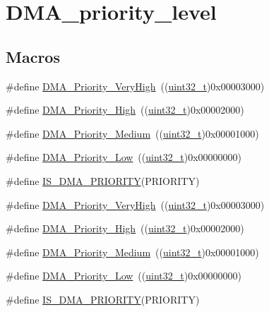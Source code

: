 \hypertarget{group___d_m_a__priority__level}{}\section{D\+M\+A\+\_\+priority\+\_\+level}
\label{group___d_m_a__priority__level}
\subsection*{Macros}
\begin{DoxyCompactItemize}
\item 
\#define \hyperlink{group___d_m_a__priority__level_gadccd2f8b2ac24ba4fd485dd5b9b48671}{D\+M\+A\+\_\+\+Priority\+\_\+\+Very\+High}~((\hyperlink{_p_e___types_8h_a33594304e786b158f3fb30289278f5af}{uint32\+\_\+t})0x00003000)
\item 
\#define \hyperlink{group___d_m_a__priority__level_gae2441c0b4d4ba9945a6f4f7d08045a8e}{D\+M\+A\+\_\+\+Priority\+\_\+\+High}~((\hyperlink{_p_e___types_8h_a33594304e786b158f3fb30289278f5af}{uint32\+\_\+t})0x00002000)
\item 
\#define \hyperlink{group___d_m_a__priority__level_ga8e0d4a958f4288c6c759945789490f38}{D\+M\+A\+\_\+\+Priority\+\_\+\+Medium}~((\hyperlink{_p_e___types_8h_a33594304e786b158f3fb30289278f5af}{uint32\+\_\+t})0x00001000)
\item 
\#define \hyperlink{group___d_m_a__priority__level_gaf414e0aa8dd42aee6f83f88ab6175179}{D\+M\+A\+\_\+\+Priority\+\_\+\+Low}~((\hyperlink{_p_e___types_8h_a33594304e786b158f3fb30289278f5af}{uint32\+\_\+t})0x00000000)
\item 
\#define \hyperlink{group___d_m_a__priority__level_gaa1cae2ab458948511596467c87cd02b6}{I\+S\+\_\+\+D\+M\+A\+\_\+\+P\+R\+I\+O\+R\+I\+TY}(P\+R\+I\+O\+R\+I\+TY)
\item 
\#define \hyperlink{group___d_m_a__priority__level_gadccd2f8b2ac24ba4fd485dd5b9b48671}{D\+M\+A\+\_\+\+Priority\+\_\+\+Very\+High}~((\hyperlink{_p_e___types_8h_a33594304e786b158f3fb30289278f5af}{uint32\+\_\+t})0x00003000)
\item 
\#define \hyperlink{group___d_m_a__priority__level_gae2441c0b4d4ba9945a6f4f7d08045a8e}{D\+M\+A\+\_\+\+Priority\+\_\+\+High}~((\hyperlink{_p_e___types_8h_a33594304e786b158f3fb30289278f5af}{uint32\+\_\+t})0x00002000)
\item 
\#define \hyperlink{group___d_m_a__priority__level_ga8e0d4a958f4288c6c759945789490f38}{D\+M\+A\+\_\+\+Priority\+\_\+\+Medium}~((\hyperlink{_p_e___types_8h_a33594304e786b158f3fb30289278f5af}{uint32\+\_\+t})0x00001000)
\item 
\#define \hyperlink{group___d_m_a__priority__level_gaf414e0aa8dd42aee6f83f88ab6175179}{D\+M\+A\+\_\+\+Priority\+\_\+\+Low}~((\hyperlink{_p_e___types_8h_a33594304e786b158f3fb30289278f5af}{uint32\+\_\+t})0x00000000)
\item 
\#define \hyperlink{group___d_m_a__priority__level_gaa1cae2ab458948511596467c87cd02b6}{I\+S\+\_\+\+D\+M\+A\+\_\+\+P\+R\+I\+O\+R\+I\+TY}(P\+R\+I\+O\+R\+I\+TY)
\end{DoxyCompactItemize}


